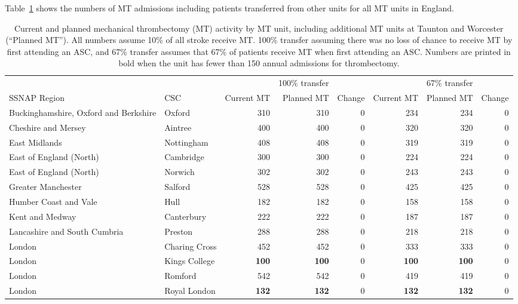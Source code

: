 Table~\ref{tab:mt_units_all} shows the numbers of MT admissions including patients transferred from other units for all MT units in England.

\begin{landscape}
\begin{table}[htbp]
    \centering
    \caption{Current and planned mechanical thrombectomy (MT) activity by MT unit, including additional MT units at Taunton and Worcester (``Planned MT''). All numbers assume 10\% of all stroke receive MT. 100\% transfer assuming there was no loss of chance to receive MT by first attending an ASC, and 67\% transfer assumes that 67\% of patients receive MT when first attending an ASC. Numbers are printed in bold when the unit has fewer than 150 annual admissions for thrombectomy.}
    \label{tab:mt_units_all}
    \begin{tabular}{ll|rrr|rrr}
    \hline
     &  & & 100\% transfer & & & 67\% transfer & \\
    SSNAP Region & CSC & Current MT & Planned MT & Change & Current MT & Planned MT & Change \\
    \hline
    Buckinghamshire, Oxford and Berkshire & Oxford & 310 & 310 & 0 & 234 & 234 & 0 \\
    Cheshire and Mersey & Aintree & 400 & 400 & 0 & 320 & 320 & 0 \\
    East Midlands & Nottingham & 408 & 408 & 0 & 319 & 319 & 0 \\
    East of England (North) & Cambridge & 300 & 300 & 0 & 224 & 224 & 0 \\
    East of England (North) & Norwich & 302 & 302 & 0 & 243 & 243 & 0 \\
    Greater Manchester & Salford & 528 & 528 & 0 & 425 & 425 & 0 \\
    Humber Coast and Vale & Hull & 182 & 182 & 0 & 158 & 158 & 0 \\
    Kent and Medway & Canterbury & 222 & 222 & 0 & 187 & 187 & 0 \\
    Lancashire and South Cumbria & Preston & 288 & 288 & 0 & 218 & 218 & 0 \\
    London & Charing Cross & 452 & 452 & 0 & 333 & 333 & 0 \\
    London & Kings College & \textbf{100} & \textbf{100} & 0 & \textbf{100} & \textbf{100} & 0 \\
    London & Romford & 542 & 542 & 0 & 419 & 419 & 0 \\
    London & Royal London & \textbf{132} & \textbf{132} & 0 & \textbf{132} & \textbf{132} & 0 \\

\end{tabular}
\end{table}
\end{landscape}
